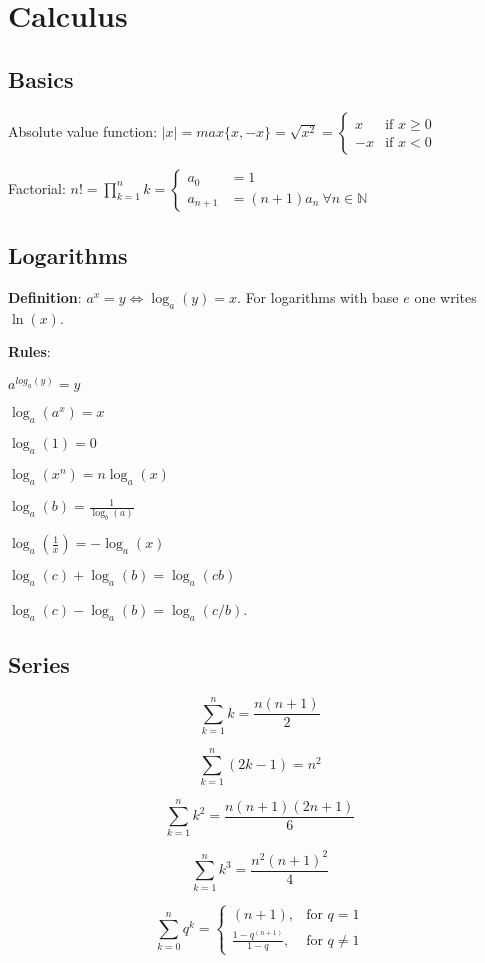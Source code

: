 \documentclass[../formulario.tex]{subfiles}
\begin{document}
\chapter{Calculus}

\section{Basics}

Absolute value function: $ \left|x\right| = max\{x,-x\} = \sqrt{x^2} = \begin{cases}
																		x & \text{if } x\geq0\\
																		-x & \text{if } x<0
																	\end{cases} $

Factorial: $ n! = \prod_{k=1}^{n}k  = \begin{cases}
										a_0 &= 1\\
										a_{n+1} &= (n+1)a_n \ \forall n \in \mathbb{N}
										\end{cases} $

\section{Logarithms}
{\bf Definition}: $a^x=y\Leftrightarrow\log_a(y)=x $. For logarithms with
base $e$ one writes $\ln(x)$.

{\bf Rules}:
\begin{multicols}{3}

 $a^{log_a(y)}=y $
 
 $\log_a(a^x)=x$
 
 $\log_a(1)=0$
 
 $\log_a(x^n)=n\log_a(x)$

 $\log_a(b)=\frac{1}{\log_b(a)}$
 
 $\log_a(\frac{1}{x})=-\log_a(x)$
  
 $\log_a(c)+\log_a(b)=\log_a(cb)$
 
 $\log_a(c)-\log_a(b)=\log_a(c/b)$.
 
\end{multicols}


\section{Series}	
\begin{multicols}{3}
	
\[ \sum_{k=1}^n k = \frac{n(n+1)}{2} \]

\[ \sum_{k=1}^n (2k-1) = n^2 \]

\[ \sum_{k=1}^n k^2 = \frac{n(n+1)(2n+1)}{6} \]

\[ \sum_{k=1}^n k^3 = \frac{n^2(n+1)^2}{4} \]

\[
\sum_{k=0}^{n}q^k = \begin{cases}
                         (n+1), & \text{for } q=1\\
                         \frac{1-q^{(n+1)}}{1-q}, & \text{for } q\neq1
                    \end{cases}
\]
	
\end{multicols}
\end{document}

